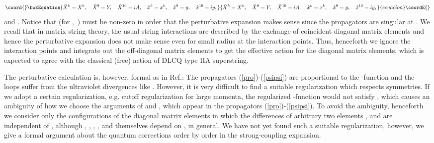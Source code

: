 \documentclass[a4paper,12pt]{article}
\begin{document}
\begin{equation}\coord{}\boxEquation{
  \hat{X}^k=X^k,\quad\hat{X}^9=Y,\quad\hat{X}^{10}=iA,\quad
  \hat{x}^k=x^k,\quad\hat{x}^9=y,\quad\hat{x}^{10}=iy,\label{hatX}
}{
  \hat{X}^k=X^k,\quad\hat{X}^9=Y,\quad\hat{X}^{10}=iA,\quad
  \hat{x}^k=x^k,\quad\hat{x}^9=y,\quad\hat{x}^{10}=iy,}{ecuacion}\coordE{}\end{equation}
and \coordHE{}.
Notice that \coordHE{} (for \coordHE{},\ \coordHE{}) must be
non-zero in order that the perturbative expansion makes sense since
the propagators are singular at \coordHE{}.
We recall that in matrix string theory, the usual string interactions
are described by the exchange of coincident diagonal matrix elements
and hence the perturbative expansion does not make sense even for
small radius \coordHE{} at the interaction points.
Thus, henceforth we ignore the interaction points and integrate out
the off-diagonal matrix elements to get the effective action for the
diagonal matrix elements, which is expected to agree with the
classical (free) action of DLCQ type IIA superstring.

The perturbative calculation is, however, formal as in Ref.\cite{SY}:
The propagators (\ref{pro})-(\ref{psipsi}) are proportional to the
\myHighlight{$\delta$}\coordHE{}-function \coordHE{} and
the loops suffer from the ultraviolet divergences like
\coordHE{}.
However, it is very difficult to find a suitable regularization
which respects symmetries.
If we adopt a certain regularization, e.g. cutoff regularization for
large momenta, the regularized \myHighlight{$\delta$}\coordHE{}-function \coordHE{}
would not satisfy \coordHE{},
which causes an ambiguity of how we choose the arguments of
\coordHE{} and \coordHE{}, which appear in the propagators
(\ref{pro})-(\ref{psipsi}).
To avoid the ambiguity, henceforth we consider only the configurations
of the diagonal matrix elements in which the differences of arbitrary
two elements \coordHE{}, \coordHE{} and
\coordHE{} are independent of \myHighlight{$\xi$}\coordHE{},
although \coordHE{}, \coordHE{}, \coordHE{}, \coordHE{}, \coordHE{} and \coordHE{}
themselves depend on \myHighlight{$\xi$}\coordHE{}, in general.
We have not yet found such a suitable regularization, however,
we give a formal argument about the quantum corrections order by order
in the strong-coupling expansion.
 
\end{document}
